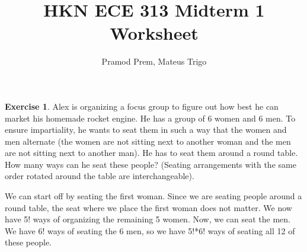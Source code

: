 \documentclass[12pt]{amsart}
\title{HKN ECE 313 Midterm 1 Worksheet}
\author{Pramod Prem, Mateus Trigo}
\theoremstyle{definition}
\newtheorem{exercise}{Exercise}
\numberwithin{equation}{section}
\theoremstyle{plain}
\begin{document}
\maketitle

\begin{exercise}
Alex is organizing a focus group to figure out how best he can market his homemade rocket engine. He has a group of 6 women and 6 men. To ensure impartiality, he wants to seat them in such a way that the women and men alternate (the women are not sitting next to another woman and the men are not sitting next to another man). He has to seat them around a round table. How many ways can he seat these people? (Seating arrangements with the same order rotated around the table are interchangeable).
\begin{answer}We can start off by seating the first woman. Since we are seating people around a round table, the seat where we place the first woman does not matter. We now have 5! ways of organizing the remaining 5 women. Now, we can seat the men. We have 6! ways of seating the 6 men, so we have 5!*6! ways of seating all 12 of these people.
\end{answer}
\end{exercise}
\end{document}
